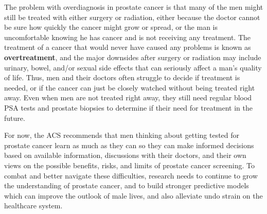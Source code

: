 The problem with overdiagnosis in prostate cancer is that many of the men might still be treated with either surgery or radiation, either because the doctor cannot be sure how quickly the cancer might grow or spread, or the man is uncomfortable knowing he has cancer and is not receiving any treatment. The treatment of a cancer that would never have caused any problems is known as \textbf{overtreatment}, and the major downsides after surgery or radiation may include urinary, bowel, and/or sexual side effects that can seriously affect a man's quality of life. Thus, men and their doctors often struggle to decide if treatment is needed, or if the cancer can just be closely watched without being treated right away. Even when men are not treated right away, they still need regular blood PSA tests and prostate biopsies to determine if their need for treatment in the future. \par
For now, the ACS recommends that men thinking about getting tested for prostate cancer learn as much as they can so they can make informed decisions based on available information, discussions with their doctors, and their own views on the possible benefits, risks, and limits of prostate cancer screening. To combat and better navigate these difficulties, research needs to continue to grow the understanding of prostate cancer, and to build stronger predictive models which can improve the outlook of male lives, and also alleviate undo strain on the healthcare system.